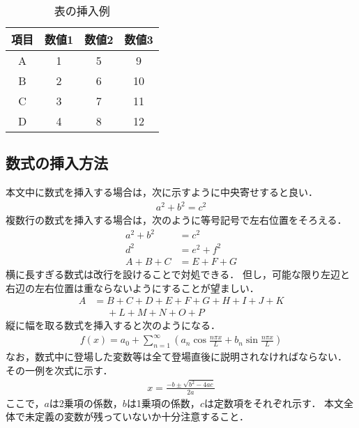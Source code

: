 \documentclass[a4j]{jsarticle}
\begin{document}
\begin{table}[t]
  \centering
  \caption{表の挿入例}
  \label{table:sample}
  \vspace{0pt} %
  \begin{tabular}{|c|c|c|c|} \hline
    項目 & 数値1 & 数値2 & 数値3 \\ \hline
    A & 1 & 5 &  9 \\ \hline
    B & 2 & 6 & 10 \\ \hline
    C & 3 & 7 & 11 \\ \hline
    D & 4 & 8 & 12 \\ \hline
  \end{tabular}
  \vspace{10pt} %
\end{table}

\subsection{数式の挿入方法}

本文中に数式を挿入する場合は，次に示すように中央寄せすると良い．
\begin{align}
  \nonumber  a^2 + b^2 = c^2
\end{align}
複数行の数式を挿入する場合は，次のように等号記号で左右位置をそろえる．
\begin{align}
  \nonumber  a^2 + b^2 &= c^2 \\
  \nonumber d^2 &= e^2 + f^2 \\
  \nonumber A + B + C &= E + F + G
\end{align}
横に長すぎる数式は改行を設けることで対処できる．
但し，可能な限り左辺と右辺の左右位置は重ならないようにすることが望ましい．
\begin{align}
  \nonumber  A &= B + C + D + E + F + G + H + I + J + K \\
  \nonumber &\phantom= + L + M + N + O + P
\end{align}
縦に幅を取る数式を挿入すると次のようになる．
\begin{align}
  \nonumber  f(x) = a_0 + \sum_{n=1}^{\infty} \left( a_n \cos \frac{ n\pi x }{ L } + b_n\sin \frac{ n\pi x }{ L } \right)
\end{align}
なお，数式中に登場した変数等は全て登場直後に説明されなければならない．
その一例を次式に示す．
\begin{align}
  \nonumber  x = \frac{ -b \pm \sqrt{ b^2 -4ac } }{ 2a }
\end{align}
ここで，$a$は2乗項の係数，$b$は1乗項の係数，$c$は定数項をそれぞれ示す．
本文全体で未定義の変数が残っていないか十分注意すること．
\end{document}
